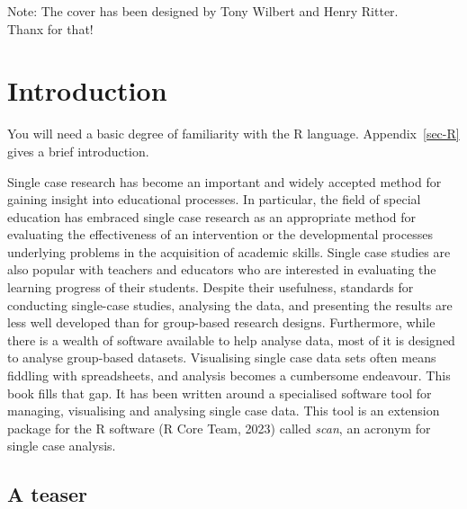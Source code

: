\documentclass[
  letterpaper,
  DIV=11,
  numbers=noendperiod]{scrreprt}
\begin{document}
Note: The cover has been designed by Tony Wilbert and Henry Ritter.\\
Thanx for that!


\hypertarget{introduction}{%
\chapter{Introduction}\label{introduction}}

\begin{tcolorbox}[enhanced jigsaw, breakable, toptitle=1mm, colframe=quarto-callout-note-color-frame, arc=.35mm, titlerule=0mm, coltitle=black, rightrule=.15mm, bottomtitle=1mm, bottomrule=.15mm, colbacktitle=quarto-callout-note-color!10!white, title=\textcolor{quarto-callout-note-color}{\faInfo}\hspace{0.5em}{Note}, colback=white, opacitybacktitle=0.6, opacityback=0, leftrule=.75mm, toprule=.15mm, left=2mm]

You will need a basic degree of familiarity with the R language.
Appendix~\ref{sec-R} gives a brief introduction.

\end{tcolorbox}

Single case research has become an important and widely accepted method
for gaining insight into educational processes. In particular, the field
of special education has embraced single case research as an appropriate
method for evaluating the effectiveness of an intervention or the
developmental processes underlying problems in the acquisition of
academic skills. Single case studies are also popular with teachers and
educators who are interested in evaluating the learning progress of
their students. Despite their usefulness, standards for conducting
single-case studies, analysing the data, and presenting the results are
less well developed than for group-based research designs. Furthermore,
while there is a wealth of software available to help analyse data, most
of it is designed to analyse group-based datasets. Visualising single
case data sets often means fiddling with spreadsheets, and analysis
becomes a cumbersome endeavour. This book fills that gap. It has been
written around a specialised software tool for managing, visualising and
analysing single case data. This tool is an extension package for the R
software (R Core Team, 2023) called \emph{scan}, an acronym for single
case analysis.

\hypertarget{a-teaser}{%
\section{A teaser}\label{a-teaser}}
\end{document}
